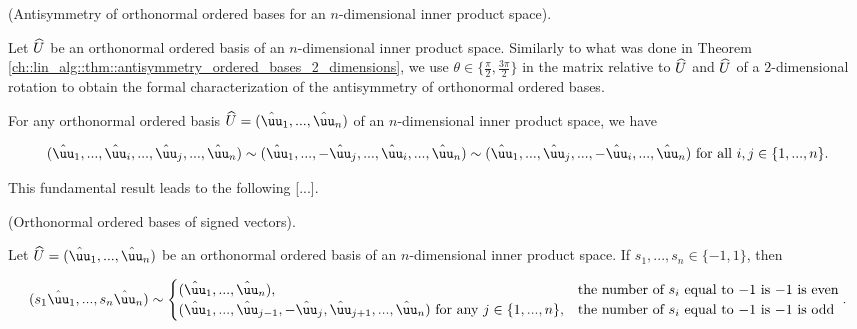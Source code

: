 \begin{theorem}
    \label{ch::lin_alg::thm::antisymmetry_ordered_bases_general}

    (Antisymmetry of orthonormal ordered bases for an $n$-dimensional inner product space).

    Let $\widehat{U}$ be an orthonormal ordered basis of an $n$-dimensional inner product space. Similarly to what was done in Theorem \ref{ch::lin_alg::thm::antisymmetry_ordered_bases_2_dimensions}, we use $\theta \in \{\frac{\pi}{2}, \frac{3\pi}{2}\}$ in the matrix relative to $\widehat{U}$ and $\widehat{U}$ of a $2$-dimensional rotation to obtain the formal characterization of the antisymmetry of orthonormal ordered bases.
    
    For any orthonormal ordered basis $\hU = (\huu_1, ..., \huu_n)$ of an $n$-dimensional inner product space, we have
    
    \begin{align*}
        (\huu_1, ..., \huu_i, ..., \huu_j, ..., \huu_n)
        \sim
        (\huu_1, ..., -\huu_j, ..., \huu_i, ..., \huu_n)
        \sim
        (\huu_1, ..., \huu_j, ..., -\huu_i, ..., \huu_n) \text{ for all $i, j \in \{1, ..., n\}$}.
    \end{align*}
\end{theorem}

This fundamental result leads to the following [...].

\begin{theorem}
    \label{ch::lin_alg::thm::antisymmetry_ordered_bases_signs}

    (Orthonormal ordered bases of signed vectors).
    
    Let $\hU = (\huu_1, ..., \huu_n)$ be an orthonormal ordered basis of an $n$-dimensional inner product space. If $s_1, ..., s_n \in \{-1, 1\}$, then

    \begin{align*}
        (s_1 \huu_1, ..., s_n \huu_n) \sim
        \begin{cases}
            (\huu_1, ..., \huu_n), & \text{the number of $s_i$ equal to $-1$ is $-1$ is even} \\
            (\huu_1, ..., \huu_{j - 1}, -\huu_j, \huu_{j + 1}, ..., \huu_n) \text{ for any $j \in \{1, ..., n\}$}, & \text{the number of $s_i$ equal to $-1$ is $-1$ is odd} 
        \end{cases}.
    \end{align*}
\end{theorem}

